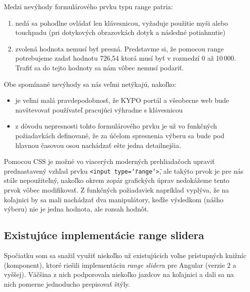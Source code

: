 \documentclass[
  printed, %
  twoside, %
  notable,   %
  nolof,   %
  nolot,   %
]{fithesis3}
\begin{document}
Medzi nevýhody formulárového prvku typu range patria:
\begin{enumerate}
\item nedá sa pohodlne ovládať len klávesnicou, vyžaduje použitie myši alebo touchpadu (pri dotykových obrazovkách dotyk a následné potiahnutie)
\item zvolená hodnota nemusí byť presná. Predstavme si, že pomocou range potrebujeme zadať hodnotu 726,54 ktorá musí byť v rozmedzí 0 až 10\,000. Trafiť sa do tejto hodnoty sa nám vôbec nemusí podariť.
\end{enumerate}

Obe spomínané nevýhody sa nás veľmi netýkajú, nakoľko:
\begin{itemize}
\item je veľmi malá pravdepodobnosť, že KYPO portál a všeobecne web bude navštevovať používateľ pracujúci výhradne s klávesnicou
\item z dôvodu nepresnosti tohto formulárového prvku je už vo funkčných požiadavkách definované, že za účelom spresnenia výberu sa bude pod hlavnou časovou osou nachádzať ešte jedna detailnejšia.
\end{itemize}

Pomocou CSS je možné vo viacerých moderných prehliadačoch upraviť prednastavený vzhľad prvku \texttt{<input type=\char`\"range\char`\">}, ale takýto prvok je pre nás stále nepoužiteľný, nakoľko okrem zopár grafických úprav nedokážeme tento prvok vôbec modifikovať. Z funkčných požiadaviek napríklad vyplýva, že na koľajnici by sa mali nachádzať dva manipulátory, keďže výsledkom (nášho výberu) nie je jedna hodnota, ale rozsah hodnôt.

\subsection{Existujúce implementácie range slidera}
Spočiatku som sa snažil využiť niekoľko už existujúcich voľne prístupných knižníc (komponent), ktoré riešili implementáciu \textit{range slider}a pre Angular (verzie 2 a vyššej). Väčšina z nich podporovala niekoľko jazdcov na koľajnici a dali sa na nich pomerne jednoducho prepisovať štýly.
\end{document}

